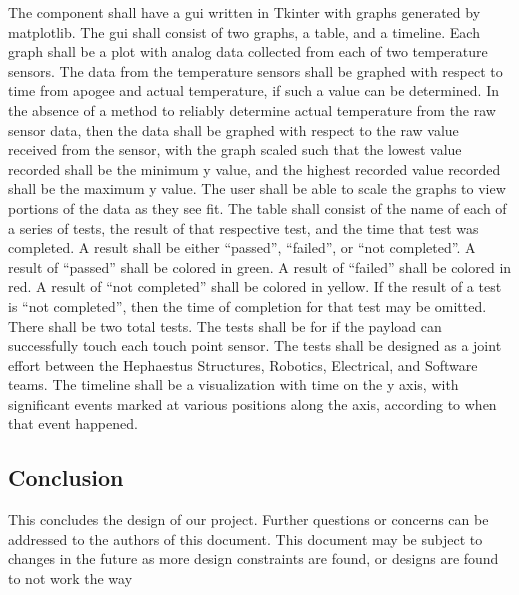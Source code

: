 The component shall have a \gls{gui} written in Tkinter with graphs generated by
\gls{matplotlib}.
The \gls{gui} shall consist of two graphs, a table, and a timeline.
Each graph shall be a \gls{plot} with analog data collected from each of two temperature sensors.
The data from the temperature sensors shall be graphed with respect to time from
\gls{apogee} and actual temperature, if such a value can be determined.
In the absence of a method to reliably determine actual temperature from the raw
sensor data, then the data shall be graphed with respect to the raw value received
from the sensor, with the graph scaled such that the lowest value recorded shall be
the minimum y value, and the highest recorded value recorded shall be the maximum y value.
The user shall be able to scale the graphs to view portions of the data as they see fit.
The table shall consist of the name of each of a series of tests,
the result of that respective test, and the time that test was completed.
A result shall be either ``passed'', ``failed'', or ``not completed''.
A result of ``passed'' shall be colored in green.
A result of ``failed'' shall be colored in red.
A result of ``not completed'' shall be colored in yellow.
If the result of a test is ``not completed'', then the time of completion for that test
may be omitted.
There shall be two total tests.
The tests shall be for if the \gls{payload} can successfully touch each touch point sensor.
The tests shall be designed as a joint effort between the Hephaestus Structures,
Robotics, Electrical, and Software teams.
The timeline shall be a visualization with time on the y axis, with significant events
marked at various positions along the axis, according to when that event happened.


\subsection{Conclusion}
This concludes the design of our project. Further questions or concerns can be addressed to the authors of this document.
This document may be subject to changes in the future as more design constraints are found, or designs are found to not work the way

